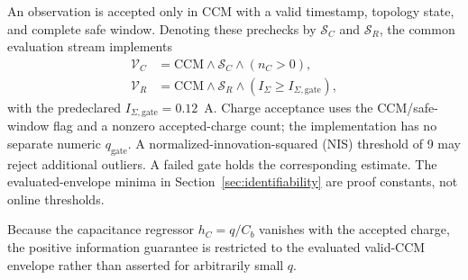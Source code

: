 An observation is accepted only in CCM with a valid timestamp, topology state, and complete safe window. Denoting these prechecks by $\mathcal S_C$ and $\mathcal S_R$, the common evaluation stream implements
\begin{equation}
\begin{aligned}
\mathcal V_C&=\mathrm{CCM}\wedge\mathcal S_C\wedge(n_C>0),\\
\mathcal V_R&=\mathrm{CCM}\wedge\mathcal S_R\wedge
(I_\Sigma\ge I_{\Sigma,\mathrm{gate}}),
\end{aligned}
\label{eq:gates}
\end{equation}
with the predeclared $I_{\Sigma,\mathrm{gate}}=0.12$~A. Charge acceptance uses the CCM/safe-window flag and a nonzero accepted-charge count; the implementation has no separate numeric $q_{\mathrm{gate}}$. A normalized-innovation-squared (NIS) threshold of 9 may reject additional \TSKF{} outliers. A failed gate holds the corresponding estimate. The evaluated-envelope minima in Section~\ref{sec:identifiability} are proof constants, not online thresholds.

Because the capacitance regressor $h_C=q/C_b$ vanishes with the accepted charge, the positive information guarantee is restricted to the evaluated valid-CCM envelope rather than asserted for arbitrarily small $q$.

